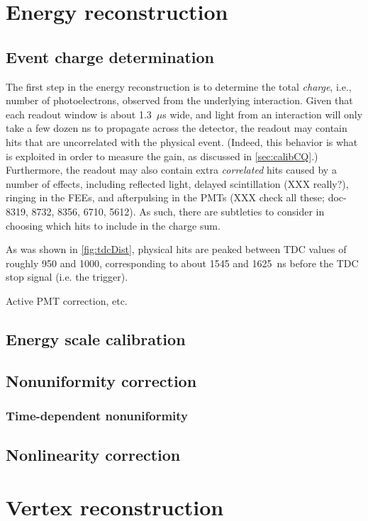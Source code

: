 \documentclass[../thesis.tex]{subfiles}
\begin{document}
\section{Energy reconstruction}
\label{sec:reconEnergy}

\subsection{Event charge determination}
\label{sec:reconEnergyCharge}

The first step in the energy reconstruction is to determine the total
\emph{charge}, i.e., number of photoelectrons, observed from the underlying
interaction. Given that each readout window is about 1.3~$\mu$s wide, and light
from an interaction will only take a few dozen ns to propagate across the
detector, the readout may contain hits that are uncorrelated with the physical
event. (Indeed, this behavior is what is exploited in order to measure the gain,
as discussed in \autoref{sec:calibCQ}.) Furthermore, the readout may also
contain extra \emph{correlated} hits caused by a number of effects, including
reflected light, delayed scintillation (XXX really?), ringing in the FEEs, and
afterpulsing in the PMTs (XXX check all these; doc-8319, 8732, 8356, 6710,
5612). As such, there are subtleties to consider in choosing which hits to
include in the charge sum.

As was shown in \autoref{fig:tdcDist}, physical hits are peaked between TDC
values of roughly 950 and 1000, corresponding to about 1545 and 1625~ns before
the TDC stop signal (i.e. the trigger).

Active PMT correction, etc.

\subsection{Energy scale calibration}
\label{sec:reconEnergyScale}

\subsection{Nonuniformity correction}
\label{sec:reconEnergyNU}

\subsubsection{Time-dependent nonuniformity}
\label{sec:reconEnergyTDNU}

\subsection{Nonlinearity correction}
\label{sec:reconEnergyNL}

\section{Vertex reconstruction}
\label{sec:reconVertex}
\end{document}
